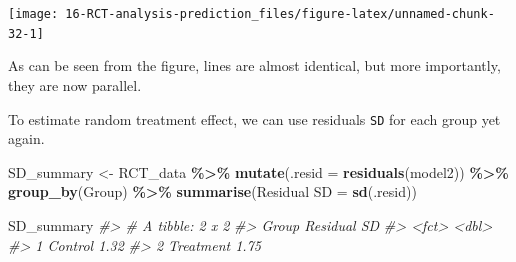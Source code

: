 \documentclass[
]{book}
\newenvironment{Shaded}{\begin{snugshade}}{\end{snugshade}}
\newcommand{\CommentTok}[1]{\textcolor[rgb]{0.56,0.35,0.01}{\textit{#1}}}
\newcommand{\DataTypeTok}[1]{\textcolor[rgb]{0.13,0.29,0.53}{#1}}
\newcommand{\DecValTok}[1]{\textcolor[rgb]{0.00,0.00,0.81}{#1}}
\newcommand{\FloatTok}[1]{\textcolor[rgb]{0.00,0.00,0.81}{#1}}
\newcommand{\KeywordTok}[1]{\textcolor[rgb]{0.13,0.29,0.53}{\textbf{#1}}}
\newcommand{\NormalTok}[1]{#1}
\newcommand{\OperatorTok}[1]{\textcolor[rgb]{0.81,0.36,0.00}{\textbf{#1}}}
\newcommand{\StringTok}[1]{\textcolor[rgb]{0.31,0.60,0.02}{#1}}
\begin{document}
\begin{Shaded}
\end{Shaded}

\begin{center}\texttt{[image: 16-RCT-analysis-prediction\_files/figure-latex/unnamed-chunk-32-1]} \end{center}

As can be seen from the figure, lines are almost identical, but more importantly, they are now parallel.

To estimate random treatment effect, we can use residuals \texttt{SD} for each group yet again.

\begin{Shaded}
\begin{Highlighting}[]
\NormalTok{SD\_summary <{-}}\StringTok{ }\NormalTok{RCT\_data }\OperatorTok{\%>\%}
\StringTok{  }\KeywordTok{mutate}\NormalTok{(}\DataTypeTok{.resid =} \KeywordTok{residuals}\NormalTok{(model2)) }\OperatorTok{\%>\%}
\StringTok{  }\KeywordTok{group\_by}\NormalTok{(Group) }\OperatorTok{\%>\%}
\StringTok{  }\KeywordTok{summarise}\NormalTok{(}\StringTok{\textasciigrave{}}\DataTypeTok{Residual SD}\StringTok{\textasciigrave{}}\NormalTok{ =}\StringTok{ }\KeywordTok{sd}\NormalTok{(.resid))}

\NormalTok{SD\_summary}
\CommentTok{\#> \# A tibble: 2 x 2}
\CommentTok{\#>   Group     \textasciigrave{}Residual SD\textasciigrave{}}
\CommentTok{\#>   <fct>             <dbl>}
\CommentTok{\#> 1 Control            1.32}
\CommentTok{\#> 2 Treatment          1.75}
\end{Highlighting}
\end{Shaded}
\end{document}
